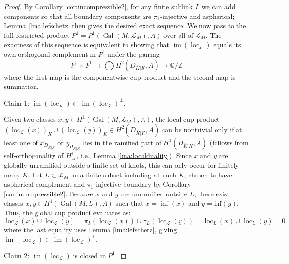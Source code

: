 \documentclass{amsart}
\theoremstyle{plain}
\theoremstyle{definition}
\theoremstyle{plain}
\theoremstyle{plain}
\theoremstyle{plain}
\theoremstyle{remark}
\theoremstyle{remark}
\theoremstyle{plain}
\theoremstyle{definition}
\theoremstyle{plain}
\DeclareMathOperator{\Gal}{\mathrm{Gal}}
\DeclareMathOperator{\loc}{\mathrm{loc}}
\DeclareMathOperator{\im}{\mathrm{im}}
\theoremstyle{plain}
\theoremstyle{plain}
\numberwithin{equation}{section}
\begin{document}
\begin{proof}
By Corollary \ref{cor:incompressible2}, for any finite sublink $L$ we can add components so that all boundary components are $\pi_1$-injective and aspherical; Lemma \ref{lma:lefschetz} then gives the desired exact sequence. We now pass to the full restricted product $P^1 = P^1(\Gal(M, \mathcal{L}_M), A)$ over all of $\mathcal{L}_M$. The exactness of this sequence is equivalent to showing that $\im(\loc_{\mathcal{L}})$ equals its own orthogonal complement in $P^1$ under the pairing
\begin{equation}
    P^1 \times P^1 \rightarrow \bigoplus H^2(D_{\overline{K}|K}, A) \to \mathbb{Q}/\mathbb{Z}
\end{equation}
where the first map is the componentwise cup product and the second map is summation.

\medskip

\underline{Claim 1: $\im(\loc_{\mathcal{L}}) \subset \im(\loc_{\mathcal{L}})^\perp$.}

\medskip

Given two classes $x, y \in H^1(\Gal(M, \mathcal{L}_M), A)$, the local cup product $(\loc_{\mathcal{L}}(x))_K \cup (\loc_{\mathcal{L}}(y))_K \in H^2(D_{\overline{K}|K}, A)$ can be nontrivial only if at least one of $x_{D_{\overline{K}|K}}$ or $y_{D_{\overline{K}|K}}$ lies in the ramified part of $H^1(D_{\overline{K}|K}, A)$ (follows from self-orthogonality of $H^1_{ur}$, i.e., Lemma \ref{lma:localduality}). Since $x$ and $y$ are globally unramified outside a finite set of knots, this can only occur for finitely many $K$. Let $L \subset \mathcal{L}_M$ be a finite subset including all such $K$, chosen to have aspherical complement and $\pi_1$-injective boundary by Corollary \ref{cor:incompressible2}. Because $x$ and $y$ are unramified outside $L$, there exist classes $\overline{x}, \overline{y} \in H^1(\Gal(M, L), A)$ such that $x = \inf(\overline{x})$ and $y = \text{inf}(\overline{y})$. Thus, the global cup product evaluates as:
\begin{equation}
    \loc_\mathcal{L}(x) \cup \loc_\mathcal{L}(y) = \pi_L(\loc_{\mathcal{L}}(x)) \cup \pi_L(\loc_{\mathcal{L}}(y)) = \loc_L(\overline{x}) \cup \loc_L(\overline{y}) = 0
\end{equation}
where the last equality uses Lemma \ref{lma:lefschetz}, giving $\im(\loc_{\mathcal{L}}) \subset \im(\loc_{\mathcal{L}})^\perp$.

\medskip

\underline{Claim 2: $\im(\loc_{\mathcal{L}})$ is closed in $P^1$.}


\end{proof}
\end{document}
